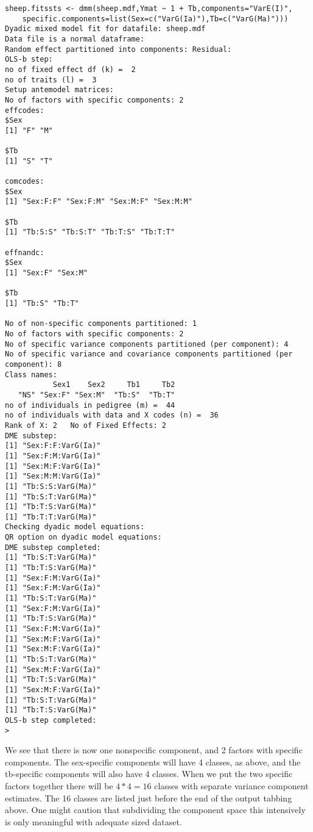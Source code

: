 \documentclass[titlepage]{article}  %
\begin{document}
\begin{verbatim}
sheep.fitssts <- dmm(sheep.mdf,Ymat ~ 1 + Tb,components="VarE(I)",
    specific.components=list(Sex=c("VarG(Ia)"),Tb=c("VarG(Ma)")))
Dyadic mixed model fit for datafile: sheep.mdf  
Data file is a normal dataframe:
Random effect partitioned into components: Residual:
OLS-b step:
no of fixed effect df (k) =  2 
no of traits (l) =  3 
Setup antemodel matrices:
No of factors with specific components: 2 
effcodes:
$Sex
[1] "F" "M"

$Tb
[1] "S" "T"

comcodes:
$Sex
[1] "Sex:F:F" "Sex:F:M" "Sex:M:F" "Sex:M:M"

$Tb
[1] "Tb:S:S" "Tb:S:T" "Tb:T:S" "Tb:T:T"

effnandc:
$Sex
[1] "Sex:F" "Sex:M"

$Tb
[1] "Tb:S" "Tb:T"

No of non-specific components partitioned: 1 
No of factors with specific components: 2 
No of specific variance components partitioned (per component): 4 
No of specific variance and covariance components partitioned (per component): 8 
Class names:
           Sex1    Sex2     Tb1     Tb2 
   "NS" "Sex:F" "Sex:M"  "Tb:S"  "Tb:T" 
no of individuals in pedigree (m) =  44 
no of individuals with data and X codes (n) =  36 
Rank of X: 2   No of Fixed Effects: 2 
DME substep:
[1] "Sex:F:F:VarG(Ia)"
[1] "Sex:F:M:VarG(Ia)"
[1] "Sex:M:F:VarG(Ia)"
[1] "Sex:M:M:VarG(Ia)"
[1] "Tb:S:S:VarG(Ma)"
[1] "Tb:S:T:VarG(Ma)"
[1] "Tb:T:S:VarG(Ma)"
[1] "Tb:T:T:VarG(Ma)"
Checking dyadic model equations:
QR option on dyadic model equations:
DME substep completed:
[1] "Tb:S:T:VarG(Ma)"
[1] "Tb:T:S:VarG(Ma)"
[1] "Sex:F:M:VarG(Ia)"
[1] "Sex:F:M:VarG(Ia)"
[1] "Tb:S:T:VarG(Ma)"
[1] "Sex:F:M:VarG(Ia)"
[1] "Tb:T:S:VarG(Ma)"
[1] "Sex:F:M:VarG(Ia)"
[1] "Sex:M:F:VarG(Ia)"
[1] "Sex:M:F:VarG(Ia)"
[1] "Tb:S:T:VarG(Ma)"
[1] "Sex:M:F:VarG(Ia)"
[1] "Tb:T:S:VarG(Ma)"
[1] "Sex:M:F:VarG(Ia)"
[1] "Tb:S:T:VarG(Ma)"
[1] "Tb:T:S:VarG(Ma)"
OLS-b step completed:
> 
\end{verbatim}
We see that there is now one nonspecific component, and 2 factors with specific components. The sex-specific components will have 4 classes, as above, and the tb-specific components will also have 4 classes. When we put the two specific factors together there will be $4 * 4 = 16$ classes with separate variance component estimates. The 16 classes are listed just before the end of the output tabbing above. One might caution that subdividing the component space this intensively is only meaningful with adequate sized dataset.
\end{document}
